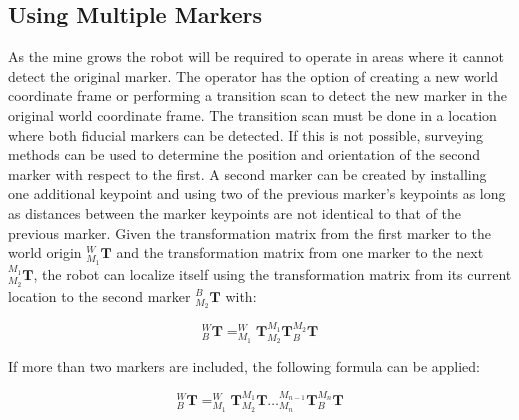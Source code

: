 \subsection{Using Multiple Markers}

As the mine grows the robot will be required to operate in areas where it cannot detect the original marker. The operator has the option of creating a new world coordinate frame or performing a transition scan to detect the new marker in the original world coordinate frame. The transition scan must be done in a location where both fiducial markers can be detected. If this is not possible, surveying methods can be used to determine the position and orientation of the second marker with respect to the first. A second marker can be created by installing one additional keypoint and using two of the previous marker's keypoints as long as distances between the marker keypoints are not identical to that of the previous marker. Given the transformation matrix from the first marker to the world origin $^{W}_{M_1}\mathbf{T}$ and the transformation matrix from one marker to the next $^{M_1}_{M_2}\mathbf{T}$, the robot can localize itself using the transformation matrix from its current location to the second marker $^{B}_{M_2}\mathbf{T}$ with:

\begin{equation}
\label{eq:mtmat}
    ^{W}_{B}\mathbf{T} = ^{W}_{M_1}\mathbf{T}^{M_1}_{M_2}\mathbf{T}^{M_2}_{B}\mathbf{T}
\end{equation}

If more than two markers are included, the following formula can be applied:

\begin{equation}
\label{eq:mmtmat}
   ^{W}_{B}\mathbf{T} = ^{W}_{M_1}\mathbf{T}^{M_1}_{M_2}\mathbf{T}\hdots^{M_{n-1}}_{M_n}\mathbf{T}^{M_n}_{B}\mathbf{T}
\end{equation}

